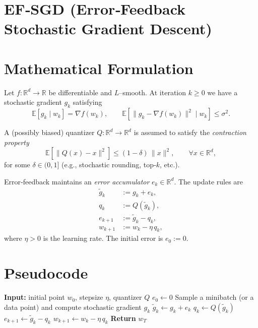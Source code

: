 \documentclass{article}
\newcommand{\E}{\mathbb{E}}
\newcommand{\R}{\mathbb{R}}
\begin{document}
\section*{EF‑SGD (Error‑Feedback Stochastic Gradient Descent)}

\section*{Mathematical Formulation}
Let $f:\R^{d}\to\R$ be differentiable and $L$–smooth.  
At iteration $k\ge 0$ we have a stochastic gradient $g_k$ satisfying
\[
\E\!\left[g_k\mid w_k\right]=\nabla f(w_k),\qquad 
\E\!\left[\|g_k-\nabla f(w_k)\|^{2}\mid w_k\right]\le\sigma^{2}.
\]

A (possibly biased) quantizer $Q:\R^{d}\to\R^{d}$ is assumed to satisfy the
\emph{contraction property}
\begin{equation}
\label{eq:quant}
\E\!\left[\|Q(x)-x\|^{2}\right]\le (1-\delta)\,\|x\|^{2},
\qquad\forall x\in\R^{d},
\end{equation}
for some $\delta\in(0,1]$ (e.g., stochastic rounding, top‑$k$, etc.).

Error‑feedback maintains an \emph{error accumulator} $e_k\in\R^{d}$.
The update rules are
\begin{align}
\label{eq:ef-update}
\tilde g_k &:= g_k + e_k,\\
\label{eq:quantized}
q_k &:= Q(\tilde g_k),\\
e_{k+1} &:= \tilde g_k - q_k,\\
\label{eq:sgd-step}
w_{k+1} &:= w_k - \eta\, q_k,
\end{align}
where $\eta>0$ is the learning rate.  
The initial error is $e_0:=0$.

\section*{Pseudocode}
\begin{algorithm}[H]
\caption{EF‑SGD}
\begin{algorithmic}[1]
\State \textbf{Input:} initial point $w_0$, stepsize $\eta$, quantizer $Q$
\State $e_0\gets 0$
    \State Sample a minibatch (or a data point) and compute stochastic gradient $g_k$
    \State $\tilde g_k \gets g_k + e_k$
    \State $q_k \gets Q(\tilde g_k)$
    \State $e_{k+1} \gets \tilde g_k - q_k$
    \State $w_{k+1} \gets w_k - \eta\, q_k$
\EndFor
\State \textbf{Return} $w_T$
\end{algorithmic}
\end{algorithm}
\end{document}

